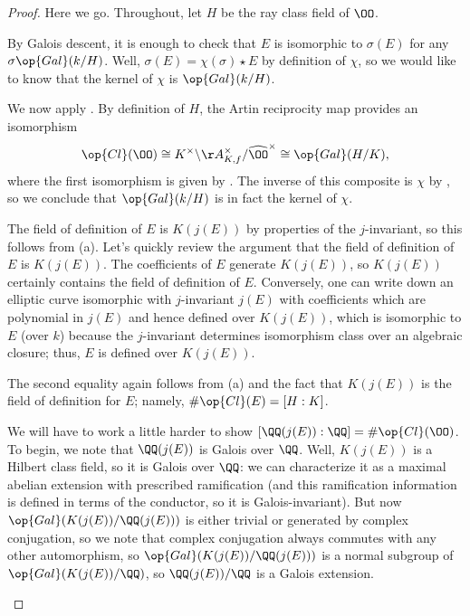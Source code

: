 \documentclass[../notes.tex]{subfiles}
\begin{document}
\begin{proof}
	Here we go. Throughout, let $H$ be the ray class field of $\OO$.
	\begin{listalph}
		\item By Galois descent, it is enough to check that $E$ is isomorphic to $\sigma(E)$ for any $\sigma\op{Gal}(k/H)$. Well, $\sigma(E)=\chi(\sigma)\star E$ by definition of $\chi$, so we would like to know that the kernel of $\chi$ is $\op{Gal}(k/H)$.
		
		We now apply . By definition of $H$, the Artin reciprocity map provides an isomorphism
		\[\op{Cl}(\OO)\cong K^\times\backslash\AA^\times_{K,f}/\widehat\OO^\times\cong\op{Gal}(H/K),\]
		where the first isomorphism is given by . The inverse of this composite is $\chi$ by , so we conclude that $\op{Gal}(k/H)$ is in fact the kernel of $\chi$.

		\item The field of definition of $E$ is $K(j(E))$ by properties of the $j$-invariant, so this follows from (a). Let's quickly review the argument that the field of definition of $E$ is $K(j(E))$. The coefficients of $E$ generate $K(j(E))$, so $K(j(E))$ certainly contains the field of definition of $E$. Conversely, one can write down an elliptic curve isomorphic with $j$-invariant $j(E)$ with coefficients which are polynomial in $j(E)$ and hence defined over $K(j(E))$, which is isomorphic to $E$ (over $k$) because the $j$-invariant determines isomorphism class over an algebraic closure; thus, $E$ is defined over $K(j(E))$.
		
		\item The second equality again follows from (a) and the fact that $K(j(E))$ is the field of definition for $E$; namely, $\#\op{Cl}(E)=[H:K]$.
		
		We will have to work a little harder to show $[\QQ(j(E)):\QQ]=\#\op{Cl}(\OO)$. To begin, we note that $\QQ(j(E))$ is Galois over $\QQ$. Well, $K(j(E))$ is a Hilbert class field, so it is Galois over $\QQ$: we can characterize it as a maximal abelian extension with prescribed ramification (and this ramification information is defined in terms of the conductor, so it is Galois-invariant). But now $\op{Gal}(K(j(E))/\QQ(j(E)))$ is either trivial or generated by complex conjugation, so we note that complex conjugation always commutes with any other automorphism, so $\op{Gal}(K(j(E))/\QQ(j(E)))$ is a normal subgroup of $\op{Gal}(K(j(E))/\QQ)$, so $\QQ(j(E))/\QQ$ is a Galois extension.
		

\end{listalph}
\end{proof}
\end{document}
